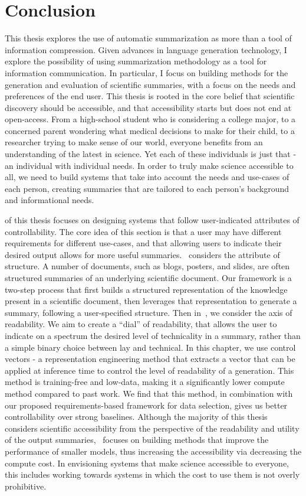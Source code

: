 \chapter{Conclusion} \label{chap:conclusion}

This thesis explores the use of automatic summarization as more than a tool of information compression. Given advances in language generation technology, I explore the possibility of using summarization methodology as a tool for information communication. In particular, I focus on building methods for the generation and evaluation of scientific summaries, with a focus on the needs and preferences of the end user. This thesis is rooted in the core belief that scientific discovery should be accessible, and that accessibility starts but does not end at open-access. From a high-school student who is considering a college major, to a concerned parent wondering what medical decisions to make for their child, to a researcher trying to make sense of our world, everyone benefits from an understanding of the latest in science. Yet each of these individuals is just that - an individual with individual needs. In order to truly make science accessible to all, we need to build systems that take into account the needs and use-cases of each person, creating summaries that are tailored to each person's background and informational needs.

 of this thesis focuses on designing systems that follow user-indicated attributes of controllability. The core idea of this section is that a user may have different requirements for different use-cases, and that allowing users to indicate their desired output allows for more useful summaries.~ considers the attribute of structure. A number of documents, such as blogs, posters, and slides, are often structured summaries of an underlying scientific document. Our framework is a two-step process that first builds a structured representation of the knowledge present in a scientific document, then leverages that representation to generate a summary, following a user-specified structure. Then in~, we consider the axis of readability. We aim to create a ``dial'' of readability, that allows the user to indicate on a spectrum the desired level of technicality in a summary, rather than a simple binary choice between lay and technical. In this chapter, we use control vectors - a representation engineering method that extracts a vector that can be applied at inference time to control the level of readability of a generation. This method is training-free and low-data, making it a significantly lower compute method compared to past work. We find that this method, in combination with our proposed requirements-based framework for data selection, gives us better controllability over strong baselines. Although the majority of this thesis considers scientific accessibility from the perspective of the readability and utility of the output summaries,~ focuses on building methods that improve the performance of smaller models, thus increasing the accessibility via decreasing the compute cost. In envisioning systems that make science accessible to everyone, this includes working towards systems in which the cost to use them is not overly prohibitive. 

